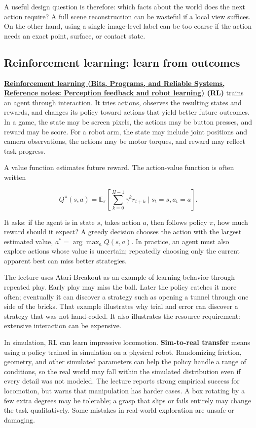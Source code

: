 A useful design question is therefore: which facts about the world does the next action require? A full scene reconstruction can be wasteful if a local view suffices. On the other hand, using a single image-level label can be too coarse if the action needs an exact point, surface, or contact state.

\subsection{Reinforcement learning: learn from outcomes}\label{04-visual-computing-ii-ch034-reinforcement-learning-learn-from-outcomes}

\textbf{\href{../01-Bits-Programs-and-Reliable-Systems/main.pdf\#nameddest=appendix-b0c42da325f1}{Reinforcement learning (Bits, Programs, and Reliable Systems, Reference notes: Perception feedback and robot learning)} (RL)} trains an agent through interaction. It tries actions, observes the resulting states and rewards, and changes its policy toward actions that yield better future outcomes. In a game, the state may be screen pixels, the actions may be button presses, and reward may be score. For a robot arm, the state may include joint positions and camera observations, the actions may be motor torques, and reward may reflect task progress.

A value function estimates future reward. The action-value function is often written

\[
Q^\pi(s,a)=\mathbb{E}_{\pi}\left[\sum_{k=0}^{H-1}\gamma^k r_{t+k}\mid s_t=s,a_t=a\right].
\]

It asks: if the agent is in state \(s\), takes action \(a\), then follows policy \(\pi\), how much reward should it expect? A greedy decision chooses the action with the largest estimated value, \(a^*=\arg\max_a Q(s,a)\). In practice, an agent must also explore actions whose value is uncertain; repeatedly choosing only the current apparent best can miss better strategies.

The lecture uses Atari Breakout as an example of learning behavior through repeated play. Early play may miss the ball. Later the policy catches it more often; eventually it can discover a strategy such as opening a tunnel through one side of the bricks. That example illustrates why trial and error can discover a strategy that was not hand-coded. It also illustrates the resource requirement: extensive interaction can be expensive.

In simulation, RL can learn impressive locomotion. \textbf{Sim-to-real transfer} means using a policy trained in simulation on a physical robot. Randomizing friction, geometry, and other simulated parameters can help the policy handle a range of conditions, so the real world may fall within the simulated distribution even if every detail was not modeled. The lecture reports strong empirical success for locomotion, but warns that manipulation has harder cases. A box rotating by a few extra degrees may be tolerable; a grasp that slips or fails entirely may change the task qualitatively. Some mistakes in real-world exploration are unsafe or damaging.


